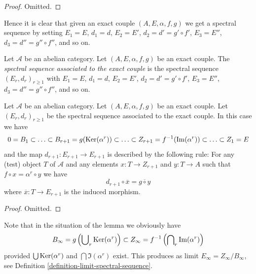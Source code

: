 \begin{proof}
Omitted.
\end{proof}

\noindent
Hence it is clear that given an exact couple $(A, E, \alpha, f, g)$
we get a spectral sequence by setting $E_1 = E$, $d_1 = d$,
$E_2 = E'$, $d_2 = d' = g' \circ f'$, $E_3 = E''$, $d_3 = d'' = g'' \circ f''$,
and so on.

\begin{definition}
\label{definition-spectral-sequence-associated-exact-couple}
Let $\mathcal{A}$ be an abelian category.
Let $(A, E, \alpha, f, g)$ be an exact couple.
The {\it spectral sequence associated to the exact couple}
is the spectral sequence $(E_r, d_r)_{r \geq 1}$ with
$E_1 = E$, $d_1 = d$, $E_2 = E'$, $d_2 = d' = g' \circ f'$,
$E_3 = E''$, $d_3 = d'' = g'' \circ f''$,
and so on.
\end{definition}

\begin{lemma}
\label{lemma-spectral-sequence-associated-exact-couple}
Let $\mathcal{A}$ be an abelian category.
Let $(A, E, \alpha, f, g)$ be an exact couple.
Let $(E_r, d_r)_{r \geq 1}$ be the spectral sequence
associated to the exact couple.
In this case we have
$$
0 = B_1 \subset \ldots \subset
B_{r + 1} = g(\mathop{\mathrm{Ker}}(\alpha^r))
\subset \ldots \subset
Z_{r + 1} = f^{-1}(\mathop{\mathrm{Im}}(\alpha^r))
\subset \ldots \subset Z_1 = E
$$
and the map $d_{r + 1} : E_{r + 1} \to E_{r + 1}$
is described by the following rule:
For any (test) object $T$ of $\mathcal{A}$ and any elements
$x : T \to Z_{r + 1}$ and $y : T \to A$ such that
$f \circ x = \alpha^r \circ y$ we have
$$
d_{r + 1} \circ \overline{x} = \overline{g \circ y}
$$
where $\overline{x} : T \to E_{r + 1}$ is the
induced morphism.
\end{lemma}

\begin{proof}
Omitted.
\end{proof}

\noindent
Note that in the situation of the lemma we obviously have
$$
B_\infty = g\left(\bigcup\nolimits_r \mathop{\mathrm{Ker}}(\alpha^r)\right)
\subset
Z_\infty = f^{-1}\left(\bigcap\nolimits_r \mathop{\mathrm{Im}}(\alpha^r)\right)
$$
provided $\bigcup \mathop{\mathrm{Ker}}(\alpha^r)$ and $\bigcap \Im(\alpha^r)$ exist.
This produces as limit $E_\infty = Z_\infty / B_\infty$, see
Definition \ref{definition-limit-spectral-sequence}.

